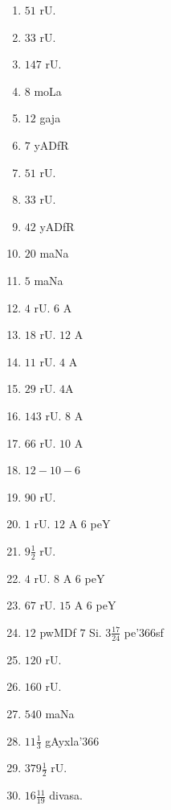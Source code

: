 \begin{multicols}{3}
\begin{enumerate}[$(1)$]
\item $51$ rU.
\item $33$ rU.
\item $147$ rU.
\item $8$ moLa
\item $12$ gaja
\item $7$ yADfR
\item $51$ rU.
\item $33$ rU.
\item $42$ yADfR
\item $20$ maNa
\item $5$ maNa
\item $4$ rU. $6$ A
\item $18$ rU. $12$ A
\item $11$ rU. $4$ A
\item $29$ rU. $4$A
\item $143$ rU. $8$ A
\item $66$ rU. $10$ A
\item $12-10-6$
\item $90$ rU.
\item $1$ rU. $12$ A $6$ peY
\item $9 \frac{1}{2}$ rU. 
\item $4$ rU. $8$ A $6$ peY
\item $67$ rU. $15$ A $6$ peY
\item $12$ pwMDf $7$ Si. $3 \frac{17}{24}$ pe\char'366sf
\item $120$ rU. 
\item $160$ rU.
\item $540$ maNa
\item $11\frac{1}{3}$ gAyxla\char'366
\item $379\frac{1}{2}$ rU. 
\item $16\frac{11}{19}$ divasa.
\end{enumerate}
\end{multicols}


